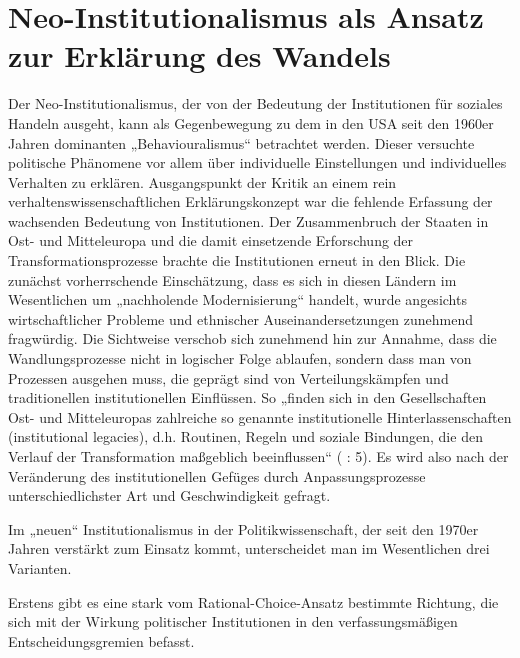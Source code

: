 \section{Neo-Institutionalismus als Ansatz zur Erklärung des Wandels}
Der Neo-Institutionalismus, der von der Bedeutung der Institutionen für soziales Handeln ausgeht, kann als Gegenbewegung zu dem in den USA seit den 1960er Jahren dominanten „Behaviouralismus“ betrachtet werden. Dieser versuchte politische Phänomene vor allem über individuelle Einstellungen und individuelles Verhalten zu erklären. Ausgangspunkt der Kritik an einem rein verhaltenswissenschaftlichen Erklärungskonzept war die fehlende Erfassung der wachsenden Bedeutung von Institutionen. Der Zusammenbruch der Staaten in Ost- und Mitteleuropa und die damit einsetzende Erforschung der Transformationsprozesse brachte die Institutionen erneut in den Blick. Die zunächst vorherrschende Einschätzung, dass es sich in diesen Ländern im Wesentlichen um „nachholende Modernisierung“ handelt, wurde angesichts wirtschaftlicher Probleme und ethnischer Auseinandersetzungen zunehmend fragwürdig. Die Sichtweise verschob sich zunehmend hin zur Annahme, dass die Wandlungsprozesse nicht in logischer Folge ablaufen, sondern dass man von Prozessen ausgehen muss, die geprägt sind von Verteilungskämpfen und traditionellen institutionellen Einflüssen. So „finden sich in den Gesellschaften Ost- und Mitteleuropas zahlreiche so genannte institutionelle Hinterlassenschaften (institutional legacies), d.h. Routinen, Regeln und soziale Bindungen, die den Verlauf der Transformation maßgeblich beeinflussen“ (\cite{schulze} : 5). Es wird also nach der Veränderung des institutionellen Gefüges durch Anpassungsprozesse unterschiedlichster Art und Geschwindigkeit gefragt. \par
Im „neuen“ Institutionalismus in der Politikwissenschaft, der seit den 1970er Jahren verstärkt zum Einsatz kommt, unterscheidet man im Wesentlichen drei Varianten.\par
Erstens gibt es eine stark vom Rational-Choice-Ansatz bestimmte Richtung, die sich mit der Wirkung politischer Institutionen in den verfassungsmäßigen Entscheidungsgremien befasst.
